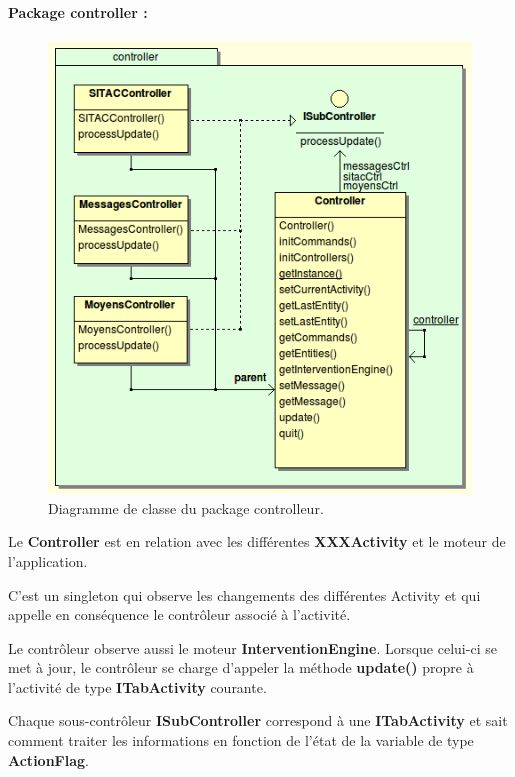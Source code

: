 \documentclass{article}
\begin{document}
\paragraph{Package controller :}
\begin{figure}[htbp]
\begin{center}
\includegraphics[width=350pt]{doc_dev-fig002.png}
\caption{Diagramme de classe du package controlleur.}
\end{center}
\end{figure}


Le \textbf{Controller} est en relation avec les différentes \textbf{XXXActivity} et le moteur de l’application.

C’est un singleton qui observe les changements des différentes Activity et qui appelle en conséquence le contrôleur associé à l'activité.

Le contrôleur observe aussi le moteur \textbf{InterventionEngine}. Lorsque celui-ci se met à jour, le contrôleur se charge d’appeler la méthode \textbf{update()} propre à l'activité de type \textbf{ITabActivity} courante.

Chaque sous-contrôleur \textbf{ISubController} correspond à une \textbf{ITabActivity} et sait comment traiter les informations en fonction de l’état de la variable de type \textbf{ActionFlag}.
\newpage
\end{document}
